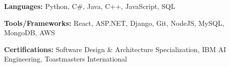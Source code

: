 \begin{siderulesSos}
\begin{skillSection}
\cvskillentry
    {
      \begin{cvsositems}
        \item {\color{black}\textbf{Languages:} Python, C\#, Java, C++, JavaScript, SQL}
        \item {\color{black}\textbf{Tools/Frameworks:} React, ASP.NET, Django, Git, NodeJS, MySQL, MongoDB, AWS}
        \item {\color{black}\textbf{Certifications:} Software Design \& Architecture Specialization, IBM AI Engineering, Toastmasters International}
      \end{cvsositems}
    }
\end{skillSection}
\end{siderulesSos}